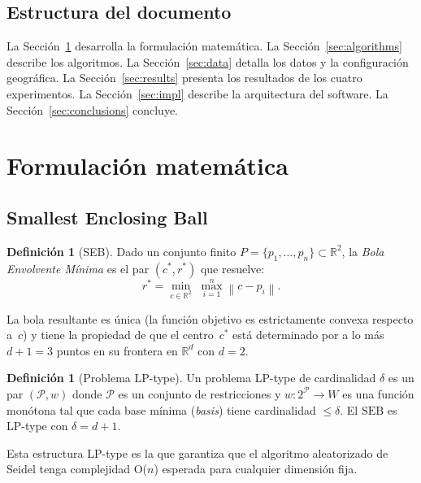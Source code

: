 \documentclass[11pt,a4paper]{article}
\theoremstyle{definition}
\newtheorem{definition}[theorem]{Definición}
\theoremstyle{remark}
\newcommand{\RR}{\mathbb{R}}
\newcommand{\PP}{\mathcal{P}}
\newcommand{\seb}{\mathrm{SEB}}
\newcommand{\norm}[1]{\left\|#1\right\|}
\begin{document}
\subsection{Estructura del documento}

La Sección~\ref{sec:formulation} desarrolla la formulación matemática.
La Sección~\ref{sec:algorithms} describe los algoritmos.
La Sección~\ref{sec:data} detalla los datos y la configuración geográfica.
La Sección~\ref{sec:results} presenta los resultados de los cuatro
experimentos.
La Sección~\ref{sec:impl} describe la arquitectura del software.
La Sección~\ref{sec:conclusions} concluye.

\section{Formulación matemática}
\label{sec:formulation}

\subsection{Smallest Enclosing Ball}

\begin{definition}[SEB]
Dado un conjunto finito $P = \{p_1, \ldots, p_n\} \subset \RR^2$, la
\emph{Bola Envolvente Mínima} es el par $(c^*, r^*)$ que resuelve:
\begin{equation}
  r^* = \min_{c \in \RR^2}\; \max_{i=1}^n \norm{c - p_i}.
  \label{eq:seb_libre}
\end{equation}
\end{definition}

La bola resultante es única (la función objetivo es estrictamente convexa
respecto a~$c$) y tiene la propiedad de que el centro~$c^*$ está determinado
por a lo más $d+1 = 3$ puntos en su frontera en $\RR^d$ con $d=2$.

\begin{definition}[Problema LP-type]
Un problema LP-type de cardinalidad $\delta$ es un par $(\PP, w)$ donde $\PP$
es un conjunto de restricciones y $w\colon 2^\PP \to W$ es una función
monótona tal que cada base mínima (\emph{basis}) tiene cardinalidad
$\leq \delta$.  El $\seb$ es LP-type con $\delta = d+1$.
\end{definition}

Esta estructura LP-type es la que garantiza que el algoritmo aleatorizado de
Seidel tenga complejidad O($n$) esperada para cualquier dimensión fija.
\end{document}
